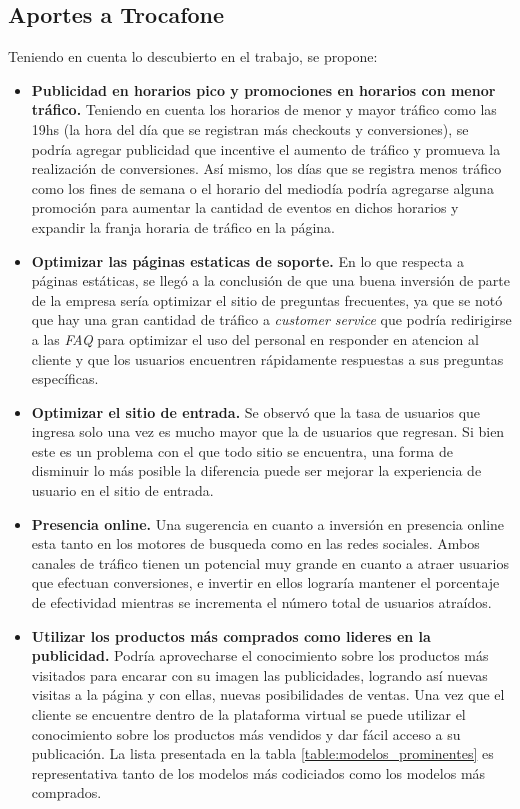 \documentclass[a4paper]{article}
\begin{document}
\subsection{Aportes a Trocafone}

Teniendo en cuenta lo descubierto en el trabajo, se propone:

\begin{itemize}
\item \textbf{Publicidad en horarios pico y promociones en horarios con menor tráfico.} Teniendo en cuenta los horarios de menor y mayor tráfico como las 19hs (la hora del día que se registran más checkouts y conversiones), se podría agregar publicidad que incentive el aumento de tráfico y promueva la realización de conversiones. Así mismo, los días que se registra menos tráfico como los fines de semana o el horario del mediodía podría agregarse alguna promoción para aumentar la cantidad de eventos en dichos horarios y expandir la franja horaria de tráfico en la página.

\item \textbf{Optimizar las páginas estaticas de soporte.} En lo que respecta a páginas estáticas, se llegó a la conclusión de que una buena inversión de parte de la empresa sería optimizar el sitio de preguntas frecuentes, ya que se notó que hay una gran cantidad de tráfico a \textit{customer service} que podría redirigirse a las \textit{FAQ} para optimizar el uso del personal en responder en atencion al cliente y que los usuarios encuentren rápidamente respuestas a sus preguntas específicas.

\item \textbf{Optimizar el sitio de entrada.} Se observó que la tasa de usuarios que ingresa solo una vez es mucho mayor que la de usuarios que regresan. Si bien este es un problema con el que todo sitio se encuentra, una forma de disminuir lo más posible la diferencia puede ser mejorar la experiencia de usuario en el sitio de entrada.

\item \textbf{Presencia online.} Una sugerencia en cuanto a inversión en presencia online esta tanto en los motores de busqueda como en las redes sociales. Ambos canales de tráfico tienen un potencial muy grande en cuanto a atraer usuarios que efectuan conversiones, e invertir en ellos lograría mantener el porcentaje de efectividad mientras se incrementa el número total de usuarios atraídos.

\item \textbf{Utilizar los productos más comprados como lideres en la publicidad.}  Podría aprovecharse el conocimiento sobre los productos más visitados para encarar con su imagen las publicidades, logrando así nuevas visitas a la página y con ellas, nuevas posibilidades de ventas. Una vez que el cliente se encuentre dentro de la plataforma virtual se puede utilizar el conocimiento sobre los productos más vendidos y dar fácil acceso a su publicación. La lista presentada en la tabla \ref{table:modelos_prominentes} es representativa tanto de los modelos más codiciados como los modelos más comprados.


\end{itemize}
\end{document}
